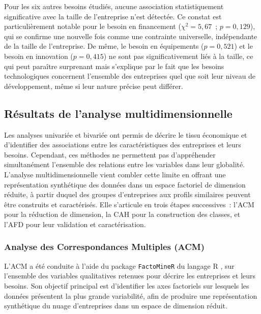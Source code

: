 \documentclass[12pt, a4paper, oneside]{report}
\begin{document}
			Pour les six autres besoins étudiés, aucune association
			statistiquement significative avec la taille de l'entreprise n'est
			détectée. Ce constat est particulièrement notable pour le besoin en
			financement ($\chi^2 = 5{,}67$~; $p = 0{,}129$), qui se confirme une
			nouvelle fois comme une contrainte universelle, indépendante de la
			taille de l'entreprise. De même, le besoin en équipements ($p =
			0{,}521$) et le besoin en innovation ($p = 0{,}415$) ne sont pas
			significativement liés à la taille, ce qui peut paraître surprenant
			mais s'explique par le fait que les besoins technologiques concernent
			l'ensemble des entreprises quel que soit leur niveau de développement,
			même si leur nature précise peut différer.
			
			
			
			
			\subsection{Résultats de l'analyse multidimensionnelle}
			\label{subsec:multi}
			
			Les analyses univariée et bivariée ont permis de décrire le tissu
			économique et d'identifier des associations entre les caractéristiques
			des entreprises et leurs besoins. Cependant, ces méthodes ne
			permettent pas d'appréhender simultanément l'ensemble des relations
			entre les variables dans leur globalité. L'analyse multidimensionnelle
			vient combler cette limite en offrant une représentation synthétique
			des données dans un espace factoriel de dimension réduite, à partir
			duquel des groupes d'entreprises aux profils similaires peuvent être
			construits et caractérisés. Elle s'articule en trois étapes
			successives~: l'ACM pour la réduction de dimension, la CAH pour
			la construction des classes, et l'AFD pour leur validation et
			caractérisation.
			
			\subsubsection{Analyse des Correspondances Multiples (ACM)}
			
			L'ACM a été conduite à l'aide du package \texttt{FactoMineR} du
			langage R %
			, sur l'ensemble des
			variables qualitatives retenues pour décrire les entreprises et
			leurs besoins. Son objectif principal est d'identifier les axes
			factoriels sur lesquels les données présentent la plus grande
			variabilité, afin de produire une représentation synthétique du
			nuage d'entreprises dans un espace de dimension réduit.
			
\end{document}
